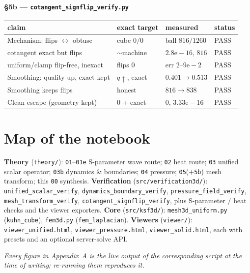 \documentclass[11pt]{article}
\newcommand{\code}[1]{\texttt{#1}}
\begin{document}
\paragraph{\S5b --- \code{cotangent\_signflip\_verify.py}}
\begin{longtable}{@{}p{5.6cm}p{3.2cm}p{3.4cm}l@{}}
\toprule
claim & exact target & measured & status \\ \midrule \endhead
Mechanism: flips $\leftrightarrow$ obtuse & cube $0/0$ & ball $816/1260$ & PASS \\
cotangent exact but flips & $\sim$machine & $2.8\mathrm{e}{-}16$, $816$ & PASS \\
uniform/clamp flip-free, inexact & flips $0$ & err $2$--$9\mathrm{e}{-}2$ & PASS \\
Smoothing: quality up, exact kept & $q\uparrow$, exact & $0.401{\to}0.513$ & PASS \\
Smoothing keeps flips & honest & $816 \to 838$ & PASS \\
Clean escape (geometry kept) & $0$ + exact & $0$, $3.33\mathrm{e}{-}16$ & PASS \\
\bottomrule
\end{longtable}

\section{Map of the notebook}
\textbf{Theory} (\code{theory/}): \code{01}--\code{01e} S-parameter wave route;
\code{02} heat route; \code{03} unified scalar operator; \code{03b} dynamics \&
boundaries; \code{04} pressure; \code{05}(+\code{5b}) mesh transform; this
\code{00} synthesis. \textbf{Verification} (\code{src/verification3d/}):
\code{unified\_scalar\_verify}, \code{dynamics\_boundary\_verify},
\code{pressure\_field\_verify}, \code{mesh\_transform\_verify},
\code{cotangent\_signflip\_verify}, plus S-parameter / heat checks and the viewer
exporters. \textbf{Core} (\code{src/ksf3d/}): \code{mesh3d\_uniform.py}
(\code{kuhn\_cube}), \code{fem3d.py} (\code{fem\_laplacian}). \textbf{Viewers}
(\code{viewer/}): \code{viewer\_unified.html}, \code{viewer\_pressure.html},
\code{viewer\_solid.html}, each with presets and an optional server-solve API.

\vspace{1em}
\noindent\emph{Every figure in Appendix~A is the live output of the corresponding
script at the time of writing; re-running them reproduces it.}
\end{document}
